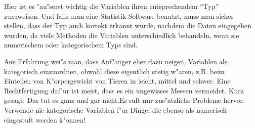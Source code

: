 \documentclass[a4paper,twoside]{tufte-book}\usepackage[]{graphicx}\usepackage[]{color}
\begin{document}
	Hier ist es "au"serst wichtig die Variablen ihren entsprechendem "`Typ"' zuzuweisen. Und falls man eine Statistik-Software benutzt, muss man sicher stellen, dass der Typ auch korrekt erkannt wurde, nachdem die Daten eingegeben wurden, da viele Methoden die Variablen unterschiedlich behandeln, wenn sie numerischem oder kategorischem Typs sind.
	
	Aus Erfahrung wei"s man, dass Anf"anger eher dazu neigen, Variablen als kategorisch einzuordnen, obwohl diese eigentlich stetig w"aren, z.B. beim Einteilen von K"orpergewicht von Tieren in leicht, mittel und schwer. Eine Rechtfertigung daf"ur ist meist, dass es ein ungewisses Messen vermeidet. Kurz gesagt: Das tut es ganz und gar nicht.Es ruft nur zus"atzliche Probleme hervor. Verwende nie kategorische Variablen f"ur Dinge, die ebenso als numerisch eingestuft werden k"onnen!
	
\end{document}

